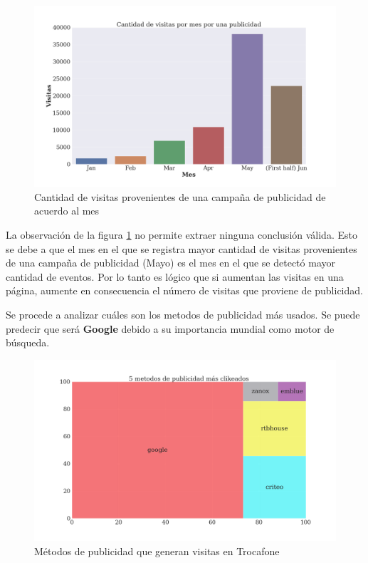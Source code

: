\documentclass[a4paper]{article}
\begin{document}
\begin{figure}[h!]
	\includegraphics[width=\linewidth]{figures/16-presupuesto-barplot.png}
	\caption{Cantidad de visitas provenientes de una campaña de publicidad de acuerdo al mes}
	\label{fig:publicidad}
\end{figure}

La observación de la figura \ref{fig:publicidad} no permite extraer ninguna conclusión válida. Esto se debe a que el mes en el que se registra mayor cantidad de visitas provenientes de una campaña de publicidad (Mayo) es el mes en el que se detectó mayor cantidad de eventos. Por lo tanto es lógico que si aumentan las visitas en una página, aumente en consecuencia el número de visitas que proviene de publicidad.

Se procede a analizar cuáles son los metodos de publicidad más usados. Se puede predecir que será \textbf{Google} debido a su importancia mundial como motor de búsqueda.

\begin{figure}[h!]
	\includegraphics[width=\linewidth]{figures/170-publicidad_clickeada-barplot.png}
	\caption{Métodos de publicidad que generan visitas en Trocafone}
	\label{fig:metodopublicidad}
\end{figure}
\end{document}
